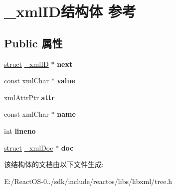 \hypertarget{struct__xml_i_d}{}\section{\+\_\+xml\+I\+D结构体 参考}
\label{struct__xml_i_d}
\subsection*{Public 属性}
\begin{DoxyCompactItemize}
\item 
\mbox{\label{struct__xml_i_d_aecf98546a7f6fa18529f744729c8c5be}} 
\hyperlink{interfacestruct}{struct} \hyperlink{struct__xml_i_d}{\+\_\+xml\+ID} $\ast$ {\bfseries next}
\item 
\mbox{\label{struct__xml_i_d_a3adb7dbd11f6592ea3cf01a96d2b62b9}} 
const xml\+Char $\ast$ {\bfseries value}
\item 
\mbox{\label{struct__xml_i_d_a0273ce499877771549f91b374bfb6f95}} 
\hyperlink{struct__xml_attr}{xml\+Attr\+Ptr} {\bfseries attr}
\item 
\mbox{\label{struct__xml_i_d_aad1ef0c2cce7d2e038499f14441493d1}} 
const xml\+Char $\ast$ {\bfseries name}
\item 
\mbox{\label{struct__xml_i_d_a108740dc154fd8bfedb996e6a2de419e}} 
int {\bfseries lineno}
\item 
\mbox{\label{struct__xml_i_d_a166cadc7fb387fbad987b030095f91a4}} 
\hyperlink{interfacestruct}{struct} \hyperlink{struct__xml_doc}{\+\_\+xml\+Doc} $\ast$ {\bfseries doc}
\end{DoxyCompactItemize}


该结构体的文档由以下文件生成\+:\begin{DoxyCompactItemize}
\item 
E\+:/\+React\+O\+S-\/0../sdk/include/reactos/libs/libxml/tree.\+h\end{DoxyCompactItemize}
